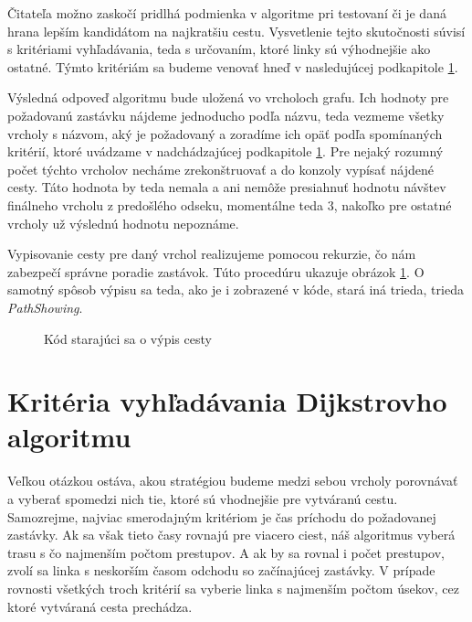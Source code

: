 Čitateľa možno zaskočí pridlhá podmienka v algoritme pri testovaní či je daná hrana lepším kandidátom na najkratšiu cestu. Vysvetlenie tejto skutočnosti súvisí s kritériami vyhľadávania, teda s určovaním, ktoré linky sú výhodnejšie ako ostatné. Týmto kritériám sa budeme venovať hneď v nasledujúcej podkapitole \ref{sec:kriteria}.\newline

Výsledná odpoveď algoritmu bude uložená vo vrcholoch grafu. Ich hodnoty pre požadovanú zastávku nájdeme jednoducho podľa názvu, teda vezmeme všetky vrcholy s názvom, aký je požadovaný a zoradíme ich opäť podľa spomínaných kritérií, ktoré uvádzame v nadchádzajúcej podkapitole \ref{sec:kriteria}. Pre nejaký rozumný počet týchto vrcholov necháme zrekonštruovať a do konzoly vypísať nájdené cesty. Táto hodnota by teda nemala a ani nemôže presiahnuť hodnotu návštev finálneho vrcholu z predošlého odseku, momentálne teda $3$, nakoľko pre ostatné vrcholy už výslednú hodnotu nepoznáme.\newline

Vypisovanie cesty pre daný vrchol realizujeme pomocou rekurzie, čo nám zabezpečí správne poradie zastávok. Túto procedúru ukazuje obrázok \ref{PathShowing}. O samotný spôsob výpisu sa teda, ako je i zobrazené v kóde, stará iná trieda, trieda \textit{PathShowing}.\newline

\begin{figure}[H]
\caption{Kód starajúci sa o výpis cesty}
\label{PathShowing}
\end{figure}


\section{Kritéria vyhľadávania Dijkstrovho algoritmu}
\label{sec:kriteria}

Veľkou otázkou ostáva, akou stratégiou budeme medzi sebou vrcholy porovnávať a vyberať spomedzi nich tie, ktoré sú vhodnejšie pre vytváranú cestu. Samozrejme, najviac smerodajným kritériom je čas príchodu do požadovanej zastávky. Ak sa však tieto časy rovnajú pre viacero ciest, náš algoritmus vyberá trasu s čo najmenším počtom prestupov. A ak by sa rovnal i počet prestupov, zvolí sa linka s neskorším časom odchodu so začínajúcej zastávky. V prípade rovnosti všetkých troch kritérií sa vyberie linka s najmenším počtom úsekov, cez ktoré vytváraná cesta prechádza.\newline

